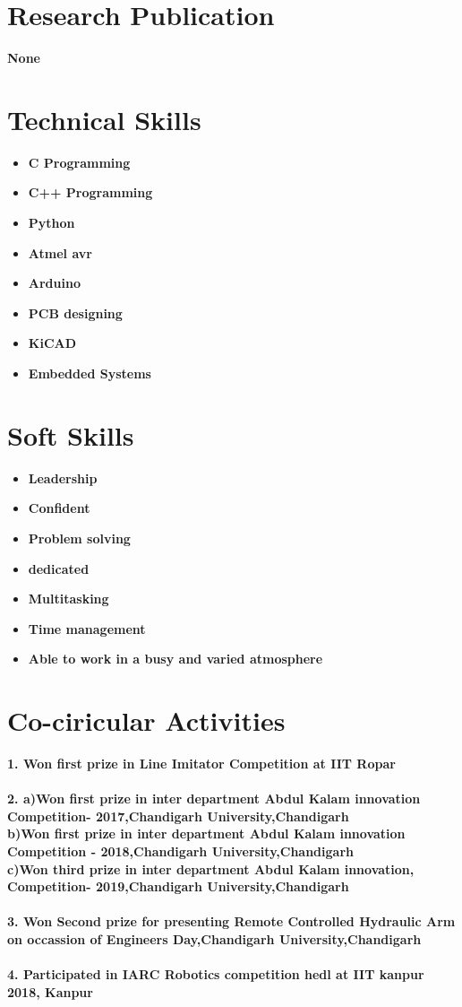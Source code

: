 \documentclass[11pt]{article}
\begin{document}
\section{Research Publication}
\textbf{None}

\section{Technical Skills}
\begin{itemize}
\item\textbf{C Programming}
\item\textbf{C++ Programming}
\item\textbf{Python}
\item\textbf{Atmel avr}
\item\textbf{Arduino}
\item\textbf{PCB designing}
\item\textbf{KiCAD}
\item\textbf{Embedded Systems}
\end{itemize}

\section{Soft Skills}
\begin{itemize}
\item\textbf{Leadership}
\item\textbf{Confident}
\item\textbf{Problem solving}
\item\textbf{dedicated}
\item\textbf{Multitasking}
\item\textbf{Time management}
\item\textbf{Able to work in a busy and varied atmosphere }
\end{itemize}

\section{Co-ciricular Activities}
\textbf{1. Won first prize in Line Imitator Competition at IIT Ropar}\\\\
\textbf{2. a)Won first prize in inter department Abdul Kalam innovation Competition- 2017,Chandigarh University,Chandigarh }\\
\textbf{ b)Won first prize in inter department Abdul Kalam innovation Competition - 2018,Chandigarh University,Chandigarh }\\
\textbf{ c)Won third prize in inter department Abdul Kalam innovation, Competition- 2019,Chandigarh University,Chandigarh }\\\\
\textbf{3. Won Second prize for presenting Remote Controlled Hydraulic Arm on occassion of Engineers Day,Chandigarh University,Chandigarh }\\\\
\textbf{4. Participated in IARC Robotics competition hedl at IIT kanpur 2018, Kanpur} \\\\
\end{document}
